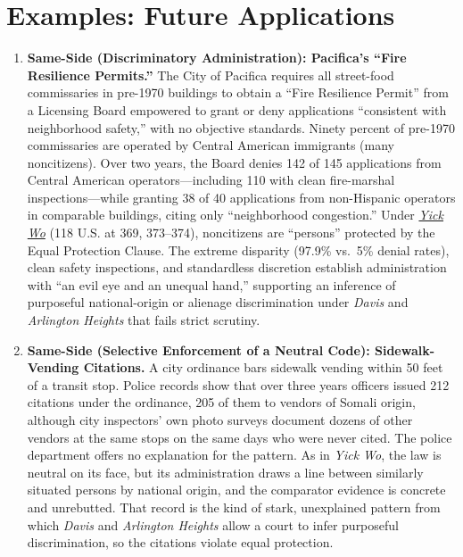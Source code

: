 \documentclass[12pt]{article}
\begin{document}
\section{Examples: Future Applications}
\begin{enumerate}

\item \textbf{Same-Side (Discriminatory Administration): Pacifica's ``Fire Resilience Permits.''} The City of Pacifica requires all street-food commissaries in pre-1970 buildings to obtain a ``Fire Resilience Permit'' from a Licensing Board empowered to grant or deny applications ``consistent with neighborhood safety,'' with no objective standards. Ninety percent of pre-1970 commissaries are operated by Central American immigrants (many noncitizens). Over two years, the Board denies 142 of 145 applications from Central American operators---including 110 with clean fire-marshal inspections---while granting 38 of 40 applications from non-Hispanic operators in comparable buildings, citing only ``neighborhood congestion.'' Under \href{https://supreme.justia.com/cases/federal/us/118/356/}{\emph{Yick Wo}} (118 U.S. at 369, 373--374), noncitizens are ``persons'' protected by the Equal Protection Clause. The extreme disparity (97.9\% vs.\ 5\% denial rates), clean safety inspections, and standardless discretion establish administration with ``an evil eye and an unequal hand,'' supporting an inference of purposeful national-origin or alienage discrimination under \emph{Davis} and \emph{Arlington Heights} that fails strict scrutiny.

\item \textbf{Same-Side (Selective Enforcement of a Neutral Code): Sidewalk-Vending Citations.} A city ordinance bars sidewalk vending within 50 feet of a transit stop. Police records show that over three years officers issued 212 citations under the ordinance, 205 of them to vendors of Somali origin, although city inspectors' own photo surveys document dozens of other vendors at the same stops on the same days who were never cited. The police department offers no explanation for the pattern. As in \textit{Yick Wo}, the law is neutral on its face, but its administration draws a line between similarly situated persons by national origin, and the comparator evidence is concrete and unrebutted. That record is the kind of stark, unexplained pattern from which \textit{Davis} and \textit{Arlington Heights} allow a court to infer purposeful discrimination, so the citations violate equal protection.


\end{enumerate}
\end{document}
